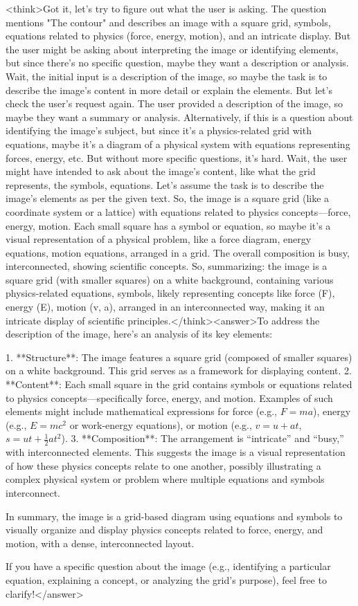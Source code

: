 <think>Got it, let's try to figure out what the user is asking. The question mentions "The contour" and describes an image with a square grid, symbols, equations related to physics (force, energy, motion), and an intricate display. But the user might be asking about interpreting the image or identifying elements, but since there's no specific question, maybe they want a description or analysis. Wait, the initial input is a description of the image, so maybe the task is to describe the image's content in more detail or explain the elements. But let's check the user's request again. The user provided a description of the image, so maybe they want a summary or analysis. Alternatively, if this is a question about identifying the image's subject, but since it's a physics-related grid with equations, maybe it's a diagram of a physical system with equations representing forces, energy, etc. But without more specific questions, it's hard. Wait, the user might have intended to ask about the image's content, like what the grid represents, the symbols, equations. Let's assume the task is to describe the image's elements as per the given text. So, the image is a square grid (like a coordinate system or a lattice) with equations related to physics concepts—force, energy, motion. Each small square has a symbol or equation, so maybe it's a visual representation of a physical problem, like a force diagram, energy equations, motion equations, arranged in a grid. The overall composition is busy, interconnected, showing scientific concepts. So, summarizing: the image is a square grid (with smaller squares) on a white background, containing various physics-related equations, symbols, likely representing concepts like force (F), energy (E), motion (v, a), arranged in an interconnected way, making it an intricate display of scientific principles.</think><answer>To address the description of the image, here’s an analysis of its key elements:  

1. **Structure**: The image features a square grid (composed of smaller squares) on a white background. This grid serves as a framework for displaying content.  
2. **Content**: Each small square in the grid contains symbols or equations related to physics concepts—specifically force, energy, and motion. Examples of such elements might include mathematical expressions for force (e.g., \( F = ma \)), energy (e.g., \( E = mc^2 \) or work-energy equations), or motion (e.g., \( v = u + at \), \( s = ut + \frac{1}{2}at^2 \)).  
3. **Composition**: The arrangement is “intricate” and “busy,” with interconnected elements. This suggests the image is a visual representation of how these physics concepts relate to one another, possibly illustrating a complex physical system or problem where multiple equations and symbols interconnect.  

In summary, the image is a grid-based diagram using equations and symbols to visually organize and display physics concepts related to force, energy, and motion, with a dense, interconnected layout.  

If you have a specific question about the image (e.g., identifying a particular equation, explaining a concept, or analyzing the grid’s purpose), feel free to clarify!</answer>